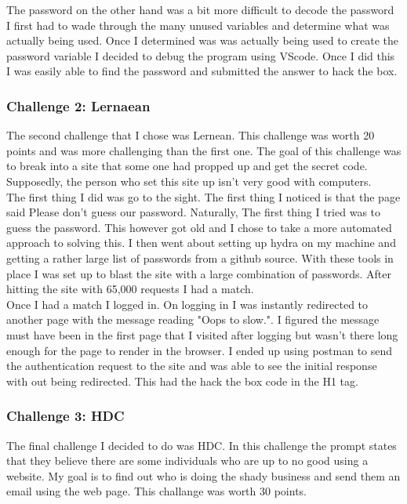 \documentclass[letterpaper, onecolumn,10pt]{IEEEtran}
\begin{document}
	        The password on the other hand was a bit more difficult to decode the password I first had to wade through the many unused variables and determine what was actually being used. Once I determined was was actually being used to create the password variable I decided to debug the program using VScode. Once I did this I was easily able to find the password and submitted the answer to hack the box.\\
	        
	        \subsubsection{Challenge 2: Lernaean}
	        The second challenge that I chose was Lernean. This challenge was worth 20 points and was more challenging than the first one. The goal of this challenge was to break into a site that some one had propped up and get the secret code. Supposedly, the person who set this site up isn't very good with computers.\\
	        
	        The first thing I did was go to the sight. The first thing I noticed is that the page said Please don't guess our password. Naturally, The first thing I tried was to guess the password. This however got old and I chose to take a more automated approach to solving this. I then went about setting up hydra on my machine and getting a rather large list of passwords from a github source. With these tools in place I was set up to blast the site with a large combination of passwords. After hitting the site with 65,000 requests I had a match.\\
	        
	        Once I had a match I logged in. On logging in I was instantly redirected to another page with the message reading "Oops to slow.". I figured the message must have been in the first page that I visited after logging but wasn't there long enough for the page to render in the browser. I ended up using postman to send the authentication request to the site and was able to see the initial response with out being redirected. This had the hack the box code in the H1 tag.\\
	        
	        \subsubsection{Challenge 3: HDC}
	        The final challenge I decided to do was HDC. In this challenge the prompt states that they believe there are some individuals who are up to no good using a website. My goal is to find out who is doing the shady business and send them an email using the web page. This challange was worth 30 points.\\
	        
\end{document}
